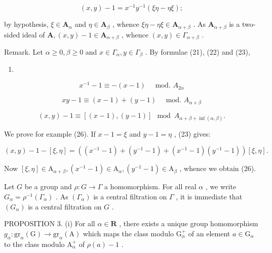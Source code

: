 \[
(x, y) - 1 = x ^ {- 1} y ^ {- 1} (\xi \eta - \eta \xi);\tag{23}
\]

by hypothesis, \(\xi \in \mathbf{A}_{\alpha}\) and \(\eta \in \mathbf{A}_{\beta}\) , whence \(\xi \eta - \eta \xi \in \mathbf{A}_{\alpha + \beta}\) . As \(\mathbf{A}_{\alpha + \beta}\) is a two-sided ideal of \(\mathbf{A}, (x, y) - 1 \in \mathbf{A}_{\alpha + \beta}\) , whence \((x, y) \in \Gamma_{\alpha + \beta}\) .

Remark. Let \(\alpha \geqslant 0, \beta \geqslant 0\) and \(x \in \Gamma_{\alpha}, y \in \Gamma_{\beta}\) . By formulae (21), (22) and (23),

\begin{enumerate}
\def\labelenumi{(\arabic{enumi})}
\setcounter{enumi}{23}
\tightlist
\item
\end{enumerate}

\[
x ^ {- 1} - 1 \equiv - (x - 1) \quad \text { mod. } A _ {2 \alpha}\tag{24}
\]

\[
x y - 1 \equiv (x - 1) + (y - 1) \quad \text { mod. } A _ {\alpha + \beta}\tag{25}
\]

\[
(x, y) - 1 \equiv [ (x - 1), (y - 1) ] \mod A _ {\alpha + \beta + \inf (\alpha , \beta)}.\tag{26}
\]

We prove for example (26). If \(x - 1 = \xi\) and \(y - 1 = \eta\) , (23) gives:

\[
(x, y) - 1 - [ \xi , \eta ] = ((x ^ {- 1} - 1) + (y ^ {- 1} - 1) + (x ^ {- 1} - 1) (y ^ {- 1} - 1)) [ \xi , \eta ].
\]

Now \([\xi, \eta] \in \mathrm{A}_{\alpha + \beta}, (x^{-1} - 1) \in \mathrm{A}_{\alpha}, (y^{-1} - 1) \in \mathrm{A}_{\beta}\) , whence we obtain (26).

Let \(G\) be a group and \(\rho: G \to \Gamma\) a homomorphism. For all real \(\alpha\) , we write \(G_{\alpha} = \rho^{-1}(\Gamma_{\alpha})\) . As \((\Gamma_{\alpha})\) is a central filtration on \(\Gamma\) , it is immediate that \((G_{\alpha})\) is a central filtration on \(G\) .

PROPOSITION 3. (i) For all \(\alpha \in \mathbf{R}\) , there exists a unique group homomorphism \(g_{\alpha} \colon \mathrm{gr}_{\alpha}(\mathrm{G}) \to \mathrm{gr}_{\alpha}(\mathrm{A})\) which maps the class modulo \(\mathrm{G}_{\alpha}^{+}\) of an element \(a \in \mathrm{G}_{\alpha}\) to the class modulo \(\mathrm{A}_{\alpha}^{+}\) of \(\rho(a) - 1\) .

